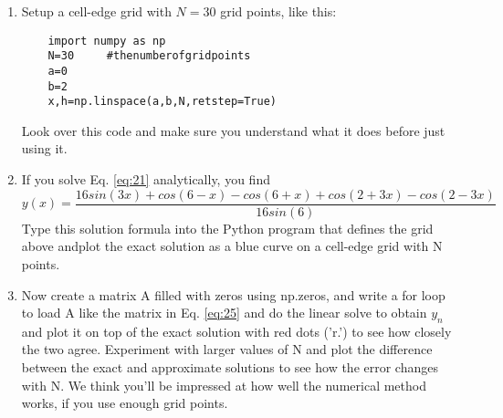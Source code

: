 \begin{problem} \label{P2.2}
\begin{enumerate}[label=(\alph*)]
	\item  Setup a cell-edge grid with $N=30$ grid points, like this: 
	\begin{lstlisting}	
	import numpy as np 
	N=30     #thenumberofgridpoints 
	a=0 
	b=2 
	x,h=np.linspace(a,b,N,retstep=True)
	\end{lstlisting}	
	 Look over this code and make sure you understand what it does before just using it.
	\item If you solve Eq. \ref{eq:21} analytically, you find
	\begin{equation}
	y(x) = \frac{16sin(3x)+cos(6-x)-cos(6+x)+cos(2+3x)-cos(2-3x)}{16sin(6)}
\end{equation}		
		Type this solution formula into the Python program that defines the grid above andplot the exact solution as a blue curve on a cell-edge grid with N points.

		\item Now create a matrix A filled with zeros using np.zeros, and write a for loop to load A like the matrix in Eq. \ref{eq:25} and do the linear solve to obtain $y_n$ and plot it on top of the exact solution with red dots ('r.') to see how closely the two agree. Experiment with larger values of N and plot the difference between the exact and approximate solutions to see how the error changes with N. We think you\rq ll be impressed at how well the numerical method works, if you use enough grid points.
\end{enumerate}
\end{problem}

